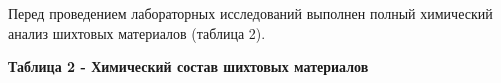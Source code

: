 
Перед проведением лабораторных исследований выполнен полный химический
анализ шихтовых материалов (таблица 2).

{\bfseries Таблица 2 - Химический состав шихтовых материалов}

